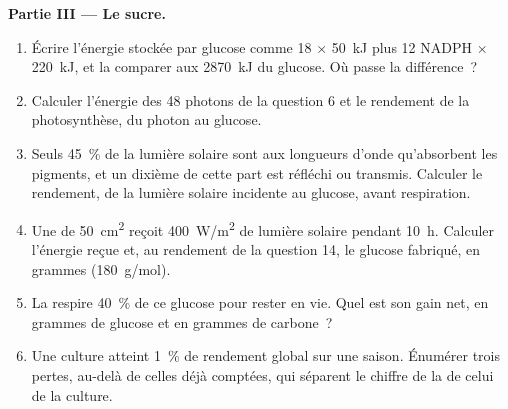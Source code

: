 \begin{problem}
\medskip
\noindent\textbf{Partie III --- Le sucre.}
\begin{enumerate}[resume]
  \item Écrire l'énergie stockée par glucose comme 18  $\times$
        \qty{50}{kJ} plus 12 NADPH $\times$ \qty{220}{kJ}, et la
        comparer aux \qty{2870}{kJ} du glucose. Où passe la différence~?
  \item Calculer l'énergie des 48 photons de la question 6 et le
        rendement de la photosynthèse, du photon au glucose.
  \item Seuls \qty{45}{\%} de la lumière solaire sont aux longueurs
        d'onde qu'absorbent les pigments, et un dixième de cette part
        est réfléchi ou transmis. Calculer le rendement, de la lumière
        solaire incidente au glucose, avant respiration.
  \item Une  de \qty{50}{cm^2} reçoit \qty{400}{W/m^2} de
        lumière solaire pendant \qty{10}{h}. Calculer l'énergie reçue
        et, au rendement de la question 14, le glucose fabriqué, en
        grammes (\qty{180}{g/mol}).
  \item La  respire \qty{40}{\%} de ce glucose pour rester en
        vie. Quel est son gain net, en grammes de glucose et en grammes
        de carbone~?
  \item Une culture atteint \qty{1}{\%} de rendement global sur une
        saison. Énumérer trois pertes, au-delà de celles déjà comptées,
        qui séparent le chiffre de la  de celui de la culture.
\end{enumerate}


\end{problem}
